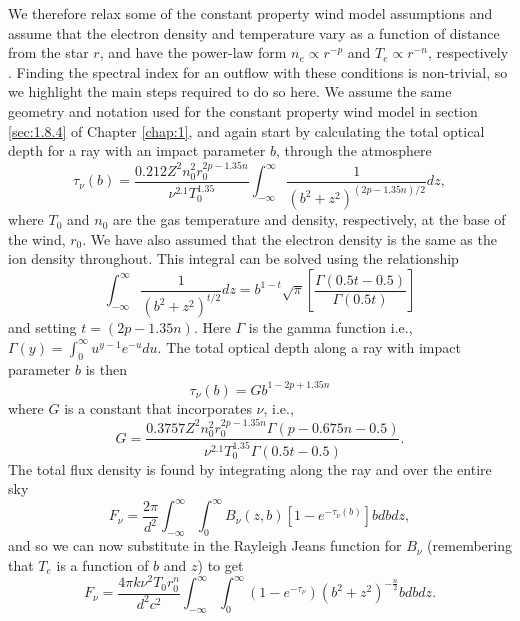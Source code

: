 We therefore relax some of the constant property wind model assumptions and assume that the electron density and temperature vary as a function of distance from the star $r$, and have the power-law form $n_{e} \propto r^{-p}$ and $T_{e} \propto r^{-n}$, respectively \citep[e.g.,][]{seaquist_1987}. Finding the spectral index for an outflow with these conditions is non-trivial, so we highlight the main steps required to do so here. We assume the same geometry and notation used for the constant property wind model in section \ref{sec:1.8.4} of Chapter \ref{chap:1}, and again start by calculating the total optical depth for a ray with an impact parameter $b$, through the atmosphere
\begin{equation}
\tau_{\nu}(b) =\frac{0.212Z^2n^2_{0}r_{0}^{2p-1.35n}}{\nu^{2.1}T_{0}^{1.35}}\int ^{\infty}_{-\infty} \frac{1}{(b^2 + z^2)^{(2p - 1.35n)/2}} dz,
\label{eq:eq6.6.1}
\end{equation}
where $T_{0}$ and $n_{0}$ are the gas temperature and density, respectively, at the base of the wind, $r_{0}$. We have also assumed that the electron density is the same as the ion density throughout. This integral can be solved using the relationship \citep{gradshteyn_1994}
\begin{equation}
\int ^{\infty}_{-\infty} \frac{1}{(b^2+z^2)^{t/2}} dz = b^{1-t}\sqrt{\pi}\left[\frac{\Gamma(0.5t-0.5)}{\Gamma (0.5t)} \right]
\label{eq:eq6.6.2}
\end{equation}
and setting $t=(2p-1.35n)$. Here $\Gamma$ is the gamma function i.e., $\Gamma (y)= \int ^{\infty}_{0} u^{y-1}e^{-u}du$. The total optical depth along a ray with impact parameter $b$ is then 
\begin{equation}
\tau_{\nu}(b) = Gb^{1-2p +1.35n}
\label{eq:eq6.6.3}
\end{equation}
where $G$ is a constant that incorporates $\nu$, i.e.,
\begin{equation}
G = \frac{0.3757Z^2n^2_{0}r_{0}^{2p-1.35n}\Gamma(p-0.675n-0.5)}{\nu^{2.1}T_{0}^{1.35}\Gamma(0.5t-0.5)}.
\end{equation}
The total flux density is found by integrating along the ray and over the entire sky
\begin{equation}
F_{\nu} = \frac{2\pi}{d^2}\int ^{\infty}_{-\infty}\int ^{\infty}_{0} B_{\nu}(z,b)[1 - e^{-\tau_{\nu}(b)}]bdbdz,
\label{eq:eq6.6.4}
\end{equation}
and so we can now substitute in the Rayleigh Jeans function for $B_{\nu}$ (remembering that $T_{e}$ is a function of $b$ and $z$) to get
\begin{equation}
F_{\nu}=\frac{4\pi k\nu^2 T_{0}r_{0}^{n}}{d^2c^2}\int ^{\infty}_{-\infty}\int ^{\infty}_{0}(1-e^{-\tau _{\nu}})(b^2+z^2)^{-\frac{n}{2}}bdbdz.
\label{eq:eq6.6.5}
\end{equation}

